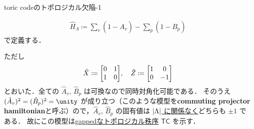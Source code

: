\documentclass[TQFT_main]{subfiles}
\begin{document}
\begin{myexample}[label=ex:toric-emf]{toric codeのトポロジカル欠陥-1}
\begin{itemize}
\begin{align}
            \label{def:TC}
            \hat{H}_\Lambda \coloneqq \sum_{v}(1 - \hat{A}_v) - \sum_p (1 - \hat{B}_p)
        \end{align}
        で定義する．
    \end{itemize}
    ただし
    \begin{align}
        \hat{X} \coloneqq \mqty[0&1\\1&0],\quad \hat{Z} \coloneqq \mqty[1&0\\0&-1]
    \end{align}
    とおいた．全ての $\hat{A}_v,\, \hat{B}_p$ は可換なので同時対角化可能である．
    そのうえ $(\hat{A}_v)^2 = (\hat{B}_p)^2 = \unity$ が成り立つ（このような模型を\textbf{commuting projector hamiltonian}と呼ぶ）ので，$\hat{A}_v,\, \hat{B}_p$ の固有値は \underline{$\abs{\Lambda}$ に関係なく}どちらも $\pm 1$ である．
    故にこの模型は\hyperref[def:quantum-phase]{gappedなトポロジカル秩序} $\mathsf{TC}$ を示す．
    

\end{myexample}
\end{document}
